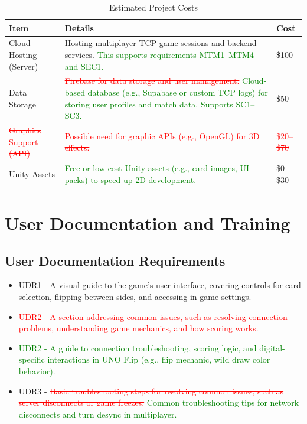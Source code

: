\documentclass[12pt]{article}
\newcommand{\removed}[1]{\textcolor{red}{\sout{#1}}}
\newcommand{\added}[1]{\textcolor{green}{#1}}
\begin{document}
\begin{table}[H]
\centering
\begin{tabular}{|p{3.5cm}|p{8.5cm}|p{2cm}|}
\hline
\textbf{Item} & \textbf{Details} & \textbf{Cost} \\
\hline
Cloud Hosting (Server) & Hosting multiplayer TCP game sessions and backend services. \added{This supports requirements MTM1–MTM4 and SEC1.} & \$100 \\
\hline
Data Storage & \removed{Firebase for data storage and user management.} \added{Cloud-based database (e.g., Supabase or custom TCP logs) for storing user profiles and match data. Supports SC1–SC3.} & \$50 \\
\hline
\removed{Graphics Support (API)} & \removed{Possible need for graphic APIs (e.g., OpenGL) for 3D effects.} & \removed{\$20–\$70} \\
\hline
Unity Assets & \added{Free or low-cost Unity assets (e.g., card images, UI packs) to speed up 2D development.} & \$0–\$30 \\
\hline
\end{tabular}
\caption{Estimated Project Costs}
\end{table}

\section{User Documentation and Training}

\subsection{User Documentation Requirements}
\begin{itemize}
    \item UDR1 - A visual guide to the game’s user interface, covering controls for card selection, flipping between sides, and accessing in-game settings.
    \item \removed{UDR2 - A section addressing common issues, such as resolving connection problems, understanding game mechanics, and how scoring works.}
    \item \added{UDR2 - A guide to connection troubleshooting, scoring logic, and digital-specific interactions in UNO Flip (e.g., flip mechanic, wild draw color behavior).}
    \item UDR3 - \removed{Basic troubleshooting steps for resolving common issues, such as server disconnects or game freezes.} \added{Common troubleshooting tips for network disconnects and turn desync in multiplayer.}
\end{itemize}
\end{document}
